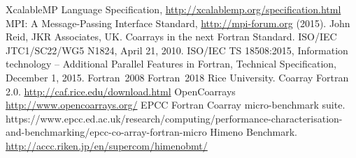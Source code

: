 \documentclass[graybox]{svmult}
\begin{document}
                                   
\begin{thebibliography}{99}
  XcalableMP Language Specification, \url{http://xcalablemp.org/specification.html}
  MPI: A Message-Passing Interface Standard, \url{http://mpi-forum.org} (2015).
  John Reid, JKR Associates, UK. Coarrays in the next Fortran Standard.
    ISO/IEC JTC1/SC22/WG5 N1824, April 21, 2010.
  ISO/IEC TS 18508:2015, Information technology -- Additional Parallel 
    Features in Fortran, Technical Specification, December 1, 2015.
  Fortran~2008
  Fortran~2018
  Rice University. Coarray Fortran 2.0. \url{http://caf.rice.edu/download.html}
  OpenCoarrays \url{http://www.opencoarrays.org/}
  EPCC Fortran Coarray micro-benchmark suite. 
    https://www.epcc.ed.ac.uk/research/computing/performance-characterisation-and-benchmarking/epcc-co-array-fortran-micro
  Himeno Benchmark. \url{http://accc.riken.jp/en/supercom/himenobmt/}

\end{thebibliography}
\end{document}
